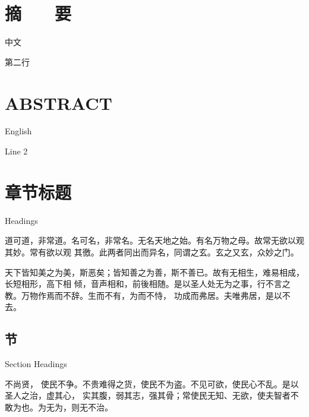 \documentclass[a4paper, twoside, openany, extrafontsizes]{dlutthesis}
\begin{document}
\maketitle

\cleardoublepage
\makedeclaration

\frontmatter

\cleardoublepage
\chapter*{摘　　要}

中文

第二行


\cleardoublepage
\chapter*{ABSTRACT}

English

Line 2


\cleardoublepage
\tableofcontents*

\cleardoublepage
\tableofencontents*

\cleardoublepage
\listoffigures*

\vspace{3em}
\listoftables*

\mainmatter

\chapter{章节标题}{Headings}

道可道，非常道。名可名，非常名。无名天地之始。有名万物之母。故常无欲以观其妙。常有欲以观
其徼。此两者同出而异名，同谓之玄。玄之又玄，众妙之门。

天下皆知美之为美，斯恶矣；皆知善之为善，斯不善已。故有无相生，难易相成，长短相形，高下相
倾，音声相和，前後相随。是以圣人处无为之事，行不言之教。万物作焉而不辞。生而不有，为而不恃，
功成而弗居。夫唯弗居，是以不去。

\section{节}{Section Headings}
\label{sec:section}


不尚贤， 使民不争。不贵难得之货，使民不为盗。不见可欲，使民心不乱。是以圣人之治，虚其心，
实其腹，弱其志，强其骨；常使民无知、无欲，使夫智者不敢为也。为无为，则无不治。
\end{document}
